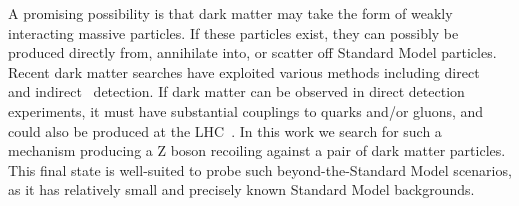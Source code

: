 A promising possibility is that dark matter may take the form of weakly interacting massive particles.
If these particles exist, they can possibly be produced directly from, annihilate into, or scatter off Standard Model particles.
Recent dark matter searches have exploited various methods including direct~\cite{Cushman:2013zza} and indirect~\cite{Buckley:2013bha} detection.
If dark matter can be observed in direct detection experiments,
it must have substantial couplings to quarks and/or gluons, and could also be produced at the LHC~\cite{Beltran:2010ww,Goodman:2010yf,Bai:2010hh,Goodman:2010ku,Fox:2011pm,Rajaraman:2011wf}.
In this work we search for such a mechanism producing a Z boson recoiling against a pair of dark matter particles.
This final state is well-suited to probe such beyond-the-Standard Model scenarios, as
it has relatively small and precisely known Standard Model backgrounds.
